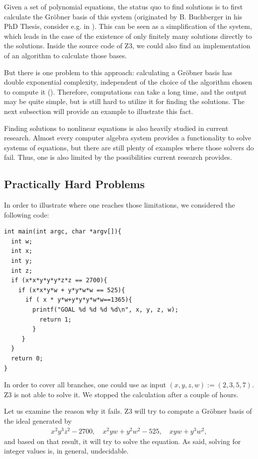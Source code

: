 \documentclass[oribibl, twocolumn]{llncs}
\begin{document}
Given a set of polynomial equations, the status quo to find solutions
is to first calculate the Gr\"obner basis of this system (originated by B. Buchberger in his PhD Thesis, consider e.g. in \cite{buchberger1970algorithmisches}). This can be seen as a
simplification of the system, which leads in the case of the existence
of only finitely many solutions directly to the solutions. Inside the
source code of \textsc{Z3}, we could also find an implementation of an
algorithm to calculate those bases.

But there is one problem to this approach: calculating a Gr\"obner
basis has double exponential complexity, independent of the choice
of the algorithm chosen to compute it (\cite{mayr1982complexity}). Therefore,
computations can take a long time, and the output may be quite simple, but is still hard to utilize it for finding the solutions. The next subsection will provide an example to illustrate
this fact.

Finding solutions to nonlinear equations is also heavily studied in current
research. Almost every computer algebra system provides a
functionality to solve systems of equations, but there are still
plenty of examples where those solvers do fail. Thus, one is also
limited by the possibilities current research provides.

\subsection{Practically Hard Problems}

In order to illustrate where one reaches those limitations, we
considered the following code:

\begin{verbatim}
int main(int argc, char *argv[]){
  int w;
  int x;
  int y;
  int z;
  if (x*x*y*y*y*z*z == 2700){
    if (x*x*y*w + y*y*w*w == 525){
      if ( x * y*w+y*y*y*w*w==1365){
        printf("GOAL %d %d %d %d\n", x, y, z, w);
          return 1;
        }
     }
  }
  return 0;
}
\end{verbatim}

In order to cover all branches, one could use as input $(x,y,z,w) :=
(2,3,5,7)$. \textsc{Z3} is not able to solve it. We stopped the
calculation after a couple of hours.

Let us examine the reason why it fails. \textsc{Z3} will try to compute
a Gr\"obner basis of the ideal generated by
\begin{eqnarray*}
  x^2y^3z^2 - 2700, \quad x^2yw + y^2w^2 - 525, \quad xyw + y^3w^2,
\end{eqnarray*}
and based on that result, it will try to solve the equation. As said,
solving for integer values is, in general, undecidable.
\end{document}
